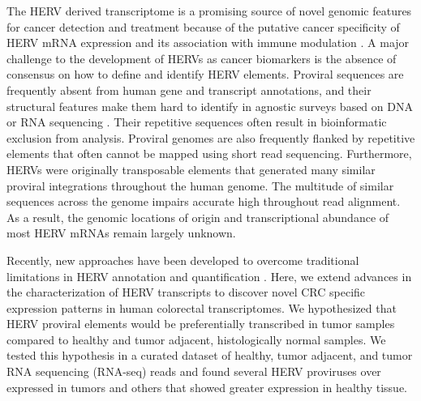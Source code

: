 The HERV derived transcriptome is a promising source of novel genomic features for cancer detection and treatment because of the putative cancer specificity of HERV mRNA expression and its association with immune modulation \citep{Chiappinelli2015, Roulois2015, Desai2017, Solovyov2018}.
A major challenge to the development of HERVs as cancer biomarkers is the absence of consensus on how to define and identify HERV elements.
Proviral sequences are frequently absent from human gene and transcript annotations, and their structural features make them hard to identify in agnostic surveys based on DNA or RNA sequencing \citep{ERVmap2018, Treangen2011}.
Their repetitive sequences often result in bioinformatic exclusion from analysis.
Proviral genomes are also frequently flanked by repetitive elements that often cannot be mapped using short read sequencing.
Furthermore, HERVs were originally transposable elements that generated many similar proviral integrations throughout the human genome.
The multitude of similar sequences across the genome impairs accurate high throughout read alignment.
As a result, the genomic locations of origin and transcriptional abundance of most HERV mRNAs remain largely unknown.

Recently, new approaches have been developed to overcome traditional limitations in HERV annotation and quantification \citep{Attig2017, Attig2019, ERVmap2018, Telescope2019, Grabski2020}.
Here, we extend advances in the characterization of HERV transcripts to discover novel CRC specific expression patterns in human colorectal transcriptomes.
We hypothesized that HERV proviral elements would be preferentially transcribed in tumor samples compared to healthy and tumor adjacent, histologically normal samples.
We tested this hypothesis in a curated dataset of healthy, tumor adjacent, and tumor RNA sequencing (RNA-seq) reads and found several HERV proviruses over expressed in tumors and others that showed greater expression in healthy tissue.
